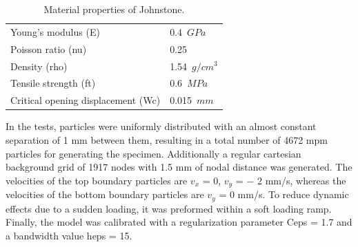 \message{ !name(2020_EFM_MPM_Eigensoftening.tex)}\documentclass[preprint,12pt,a4paper]{elsarticle}
\begin{document}
\begin{table}
  \centering
  \begin{tabular}[]{l l}
    \hline
    Young's modulus (\gls{E})   & 0.4\ $GPa$       \\
    Poisson ratio (\gls{nu})    & 0.25           \\
    Density (\gls{rho})         & 1.54\ $g/cm^3$ \\
    Tensile strength (\gls{ft}) & 0.6\ $MPa$       \\
    Critical opening displacement (\gls{Wc}) & 0.015\ $mm$ \\
    \hline
  \end{tabular}
  \caption[Mechanical properties of Johnstone. ]{Material properties of Johnstone.}
  \label{tab:Johnstone-properties}
\end{table}
In the tests, particles were uniformly distributed with an almost
constant separation of 1 mm between them, resulting in a total number of 4672
\acrshort{mpm} particles for generating the specimen. Additionally a
regular cartesian background grid of 1917 nodes with 1.5 mm of nodal distance
was generated. The velocities of the top boundary particles are $v_x$ = 0, $v_y$ = −
2 mm/s, whereas the velocities of the bottom boundary particles are
$v_y$ = 0 mm/s. To reduce dynamic effects due to a sudden loading, it
was preformed within a soft loading ramp. Finally, the model was
calibrated with a regularization parameter \gls{Ceps} = 1.7 and a
bandwidth value \gls{heps} = 15.
\end{document}
